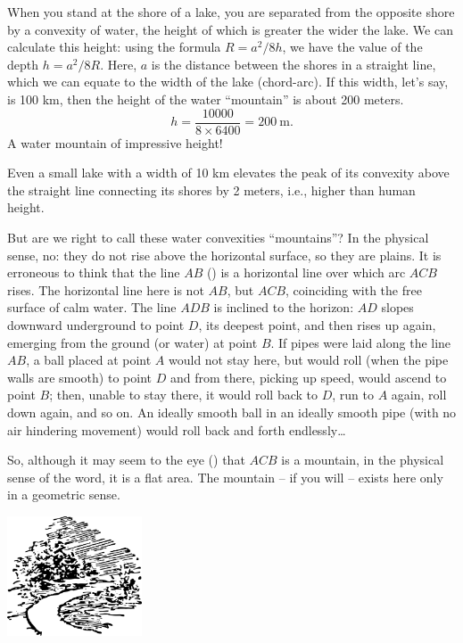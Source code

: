 When you stand at the shore of a lake, you are separated from the opposite shore by a convexity of water, the height of which is greater the wider the lake. We can calculate this height: using the formula $R = a^{2}/8h$, we have the value of the depth $h = a^{2}/8R$. Here, $a$ is the distance between the shores in a straight line, which we can equate to the width of the lake (chord-arc). If this width, let's say, is 100 km, then the height of the water ``mountain'' is about 200 meters.
\begin{equation*}%
h = \frac{10000}{8 \times 6400} = \SI{200}{\meter}.
\end{equation*}
A water mountain of impressive height!

Even a small lake with a width of 10 km elevates the peak of its convexity above the straight line connecting its shores by 2 meters, i.e., higher than human height.




But are we right to call these water convexities ``mountains''? In the physical sense, no: they do not rise above the horizontal surface, so they are plains. It is erroneous to think that the line $AB$ () is a horizontal line over which arc $ACB$ rises. The horizontal line here is not $AB$, but $ACB$, coinciding with the free surface of calm water. The line $ADB$ is inclined to the horizon: $AD$ slopes downward underground to point $D$, its deepest point, and then rises up again, emerging from the ground (or water) at point $B$. If pipes were laid along the line $AB$, a ball placed at point $A$ would not stay here, but would roll (when the pipe walls are smooth) to point $D$ and from there, picking up speed, would ascend to point $B$; then, unable to stay there, it would roll back to $D$, run to $A$ again, roll down again, and so on. An ideally smooth ball in an ideally smooth pipe (with no air hindering movement) would roll back and forth endlessly\dots{}

So, although it may seem to the eye () that $ACB$ is a mountain, in the physical sense of the word, it is a flat area. The mountain -- if you will -- exists here only in a geometric sense.


\begin{center}
\includegraphics[width=0.3\textwidth]{figures/ch-04/fig-ch-04-tail.pdf}
\end{center}


















